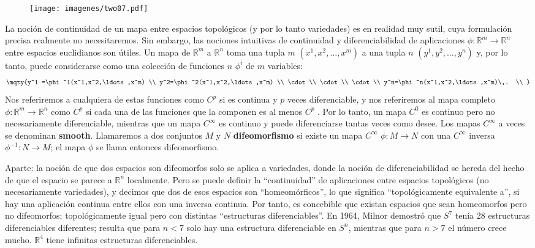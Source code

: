 \documentclass[11pt,b5paper,openany,twoside]{book}
\begin{document}
\begin{figure}[h]
\centering
\texttt{[image: imagenes/two07.pdf]}
\end{figure}

La noción de continuidad de un mapa entre espacios topológicos (y por lo tanto variedades) es en realidad muy sutil, cuya formulación precisa realmente no necesitaremos.
Sin embargo, las nociones intuitivas de continuidad y diferenciabilidad de aplicaciones $\phi:\mathbb{R}^m\rightarrow\mathbb{R}^n$ entre espacios euclidianos son útiles.
Un mapa de $\mathbb{R}^m$ a $\mathbb{R}^n$ toma una tupla $m$ $(x^1,x^2,\ldots,x^m)$ a una tupla $n$ $(y^1,y^2,\ldots,y^n)$ y, por lo tanto, puede considerarse como una colección de funciones $n$ $\phi^i$ de $m$ variables:
\begin{equation}
\mqty{y^1 =\phi^1(x^1,x^2,\ldots,x^m) \\
y^2=\phi^2(x^1,x^2,\ldots,x^m) \\
\cdot \\ \cdot \\ \cdot \\  y^n=\phi^n(x^1,x^2,\ldots,x^m)\,. \\ }
\label{2.1}
\end{equation}
Nos referiremos a cualquiera de estas funciones como $C^p$ si es continua y $p$ veces diferenciable, y nos referiremos al mapa completo $\phi:\mathbb{R}^m\rightarrow\mathbb{R}^n$ como $C^p$ si cada una de las funciones que la componen es al menos $C^p$ .
Por lo tanto, un mapa $C^0$ es continuo pero no necesariamente diferenciable, mientras que un mapa $C^\infty$ es continuo y puede diferenciarse tantas veces como desee.
Los mapas $C^\infty$ a veces se denominan {\bf smooth}.
Llamaremos a dos conjuntos $M$ y $N$ {\bf difeomorfismo} si existe un mapa $C^\infty$ $\phi:M\rightarrow N$ con una $C^\infty$ inversa $\phi^{-1}:N\rightarrow M$; el mapa $\phi$ se llama entonces difeomorfismo.

Aparte: la noción de que dos espacios son difeomorfos solo se aplica a variedades, donde la noción de diferenciabilidad se hereda del hecho de que el espacio se parece a $\mathbb{R}^n$ localmente.
Pero se puede definir la ``continuidad'' de aplicaciones entre espacios topológicos (no necesariamente variedades), y decimos que dos de esos espacios son ``homeomórficos'', lo que significa ``topológicamente equivalente a'', si hay una aplicación continua entre ellos con una inversa continua.
Por tanto, es concebible que existan espacios que sean homeomorfos pero no difeomorfos; topológicamente igual pero con distintas ``estructuras diferenciables''. En 1964, Milnor demostró que $S^7$ tenía 28 estructuras diferenciables diferentes; resulta que para $n<7$ solo hay una estructura diferenciable en $S^n$, mientras que para $n>7$ el número crece mucho.
$\mathbb{R}^4$ tiene infinitas estructuras diferenciables.
\end{document}
